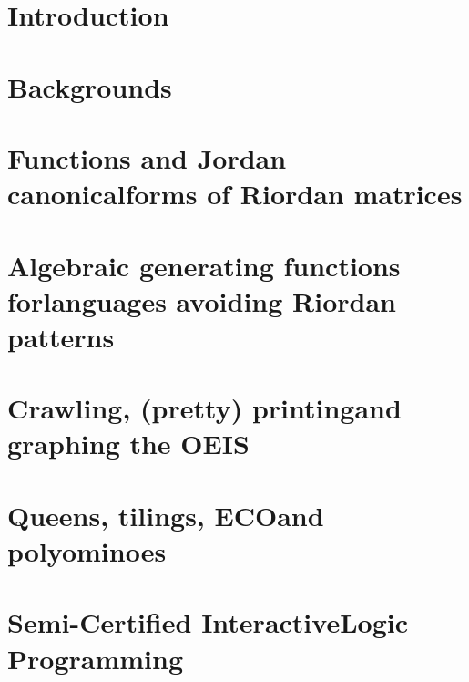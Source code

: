 \documentclass[a4paper,10pt]{tufte-book}
\begin{document}
\cleardoublepage

\chapter*{Introduction}


\cleardoublepage

\chapter{Backgrounds}
\label{ch:backgrounds}



\chapter{Functions and Jordan canonical\newline forms of Riordan matrices}
\label{ch:Riordan-matrices-function}



\chapter{Algebraic generating functions for\newline languages avoiding Riordan patterns}
\label{ch:algebraic-gfs-languages-avoiding-Riordan-patterns}



\chapter{Crawling, (pretty) printing\newline and graphing the OEIS}
\label{ch:OEIS:tools}



\chapter{Queens, tilings, ECO\newline and polyominoes}
\label{ch:queens-tilings-polyominoes}



\chapter{Semi-Certified Interactive\newline Logic Programming}
\label{ch:scilp}



\iffalse
\chapter*{Conclusions}

\fi



\end{document}
